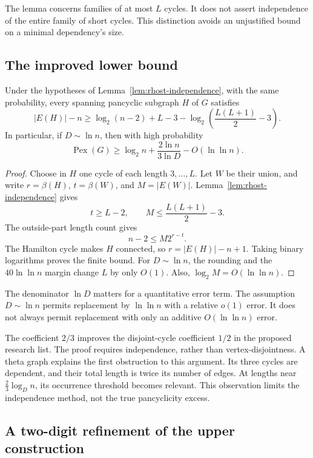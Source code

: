 The lemma concerns families of at most $L$ cycles.
It does not assert independence of the entire family of short cycles.
This distinction avoids an unjustified bound on a minimal dependency's size.

\subsection{The improved lower bound}

\begin{proposition}
\label{prop:rhost-lower}
Under the hypotheses of Lemma~\ref{lem:rhost-independence}, with the same probability,
every spanning pancyclic subgraph $H$ of $G$ satisfies
\[
 |E(H)|-n
 \ge \log_2(n-2)+L-3
 -\log_2\!\left(\frac{L(L+1)}2-3\right).
\]
In particular, if $D\sim\ln n$, then with high probability
\[
 \operatorname{Pex}(G)
 \ge\log_2 n+\frac{2\ln n}{3\ln D}-O(\ln\ln n).
\]
\end{proposition}

\begin{proof}
Choose in $H$ one cycle of each length $3,\ldots,L$.
Let $W$ be their union, and write $r=\beta(H)$, $t=\beta(W)$, and $M=|E(W)|$.
Lemma~\ref{lem:rhost-independence} gives
\[
 t\ge L-2,\qquad M\le\frac{L(L+1)}2-3.
\]
The outside-part length count gives
\[
 n-2\le M2^{r-t}.
\]
The Hamilton cycle makes $H$ connected, so $r=|E(H)|-n+1$.
Taking binary logarithms proves the finite bound.
For $D\sim\ln n$, the rounding and the $40\ln\ln n$ margin change $L$ by only $O(1)$.
Also, $\log_2 M=O(\ln\ln n)$.
\end{proof}

The denominator $\ln D$ matters for a quantitative error term.
The assumption $D\sim\ln n$ permits replacement by $\ln\ln n$ with a relative $o(1)$ error.
It does not always permit replacement with only an additive $O(\ln\ln n)$ error.

The coefficient $2/3$ improves the disjoint-cycle coefficient $1/2$ in the proposed research list.
The proof requires independence, rather than vertex-disjointness.
A theta graph explains the first obstruction to this argument.
Its three cycles are dependent, and their total length is twice its number of edges.
At lengths near $\frac23\log_D n$, its occurrence threshold becomes relevant.
This observation limits the independence method, not the true pancyclicity excess.

\subsection{A two-digit refinement of the upper construction}

